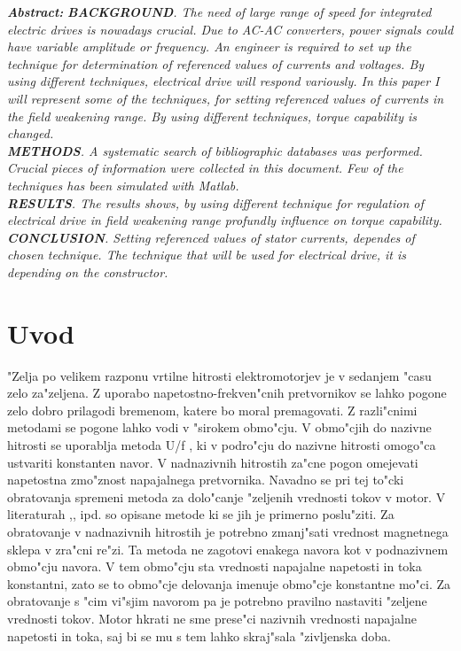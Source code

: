 \documentclass[journal,a4paper,twoside]{sty/IEEEtran}
\begin{document}
{\textbf{\textit{Abstract:}} {\it \textbf{BACKGROUND}. The need of large range of speed for integrated electric drives is nowadays crucial. Due to AC-AC converters, power signals could have variable amplitude or frequency. An engineer is required to set up the technique for determination of referenced values of currents and voltages.  By using different techniques, electrical drive will respond variously. In this paper I will represent some of the techniques, for setting referenced values of currents in the field weakening range. By using different techniques, torque capability is changed.
\\
\textbf{METHODS}.  A systematic search of bibliographic databases was performed. Crucial pieces of information were collected in this document. Few of the techniques has been simulated with Matlab.
\\
\textbf{RESULTS}. The results shows, by using different technique for regulation of electrical drive in field weakening range profundly influence on torque capability.
\\
\textbf{CONCLUSION}. Setting referenced values of stator currents, dependes of chosen technique. The technique that will be used for electrical drive, it is depending on the constructor.
}}

\section{Uvod}


"Zelja po velikem razponu vrtilne hitrosti elektromotorjev je v sedanjem "casu zelo za"zeljena. Z uporabo napetostno-frekven"cnih pretvornikov se lahko pogone zelo dobro prilagodi bremenom, katere bo moral premagovati. Z razli"cnimi metodami se pogone lahko vodi v "sirokem obmo"cju. V obmo"cjih do nazivne hitrosti se uporablja metoda U/f \cite{servopogoni}, ki v podro"cju do nazivne hitrosti omogo"ca ustvariti konstanten navor. 
V nadnazivnih hitrostih za"cne pogon omejevati napetostna zmo"znost napajalnega pretvornika.  Navadno se pri tej to"cki obratovanja spremeni metoda za dolo"canje "zeljenih vrednosti tokov v motor. V literaturah \cite{servopogoni},\cite{miljavc},\cite{vas} ipd. so opisane metode ki se jih je primerno poslu"ziti. Za obratovanje v nadnazivnih hitrostih je potrebno zmanj"sati vrednost magnetnega sklepa v zra"cni re"zi. Ta metoda ne zagotovi enakega navora kot v podnazivnem obmo"cju navora. V tem obmo"cju sta vrednosti napajalne napetosti in toka konstantni, zato se to obmo"cje delovanja imenuje obmo"cje konstantne mo"ci. Za obratovanje s "cim vi"sjim navorom pa je potrebno pravilno nastaviti "zeljene vrednosti tokov. Motor hkrati ne sme prese"ci nazivnih vrednosti napajalne napetosti in toka, saj bi se mu s tem lahko skraj"sala "zivljenska doba. 
\end{document}
